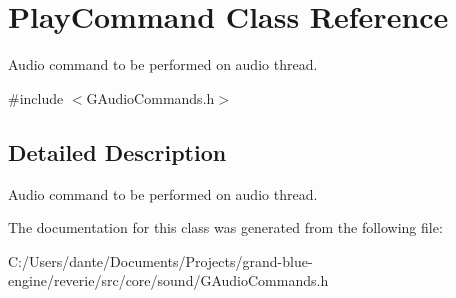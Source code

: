 \hypertarget{class_play_command}{}\section{Play\+Command Class Reference}
\label{class_play_command}


Audio command to be performed on audio thread.  




{\ttfamily \#include $<$G\+Audio\+Commands.\+h$>$}



\subsection{Detailed Description}
Audio command to be performed on audio thread. 

The documentation for this class was generated from the following file\+:\begin{DoxyCompactItemize}
\item 
C\+:/\+Users/dante/\+Documents/\+Projects/grand-\/blue-\/engine/reverie/src/core/sound/G\+Audio\+Commands.\+h\end{DoxyCompactItemize}
